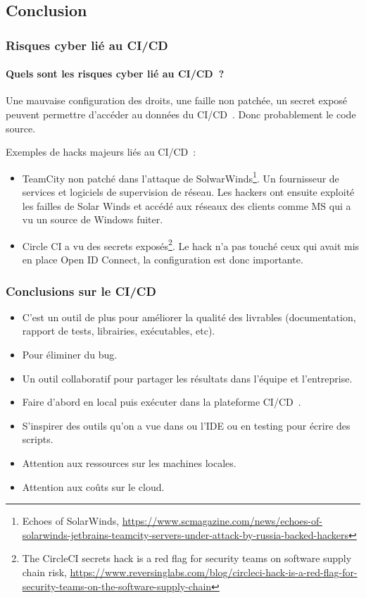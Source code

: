 \documentclass{beamer}
\begin{document}
    \subsection{Conclusion}\label{subsec:conclusion}
    \begin{frame}
        \frametitle{Risques cyber lié au CI/CD}
        \framesubtitle{Quels sont les risques cyber lié au CI/CD~?}
        \transdissolve
        \pause
        Une mauvaise configuration des droits, une faille non patchée, un secret exposé peuvent permettre d'accéder au données du CI/CD~.
        Donc probablement le code source.

        Exemples de hacks majeurs liés au CI/CD~:
        \begin{itemize}
            \item TeamCity non patché dans l'attaque de SolwarWinds\footnote{Echoes of SolarWinds, \url{https://www.scmagazine.com/news/echoes-of-solarwinds-jetbrains-teamcity-servers-under-attack-by-russia-backed-hackers}}.
            Un fournisseur de services et logiciels de supervision de réseau.
            Les hackers ont ensuite exploité les failles de Solar Winds et accédé aux réseaux des clients comme MS qui a vu un source de Windows fuiter.
            \item Circle CI a vu des secrets exposés\footnote{The CircleCI secrets hack is a red flag for security teams on software supply chain risk, \url{https://www.reversinglabs.com/blog/circleci-hack-is-a-red-flag-for-security-teams-on-the-software-supply-chain}}.
            Le hack n'a pas touché ceux qui avait mis en place Open ID Connect, la configuration est donc importante.
        \end{itemize}
    \end{frame}

    \begin{frame}
        \frametitle{Conclusions sur le CI/CD}
        \transdissolve
        \begin{itemize}
            \item C'est un outil de plus pour améliorer la qualité des livrables (documentation, rapport de tests, librairies, exécutables, etc).
            \item Pour éliminer du bug.
            \item Un outil collaboratif pour partager les résultats dans l'équipe et l'entreprise.
            \item Faire d'abord en local puis exécuter dans la plateforme CI/CD~.
            \item S'inspirer des outils qu'on a vue dans ou l'IDE ou en testing pour écrire des scripts.
            \item Attention aux ressources sur les machines locales.
            \item Attention aux coûts sur le cloud.
        \end{itemize}
    \end{frame}
\end{document}
